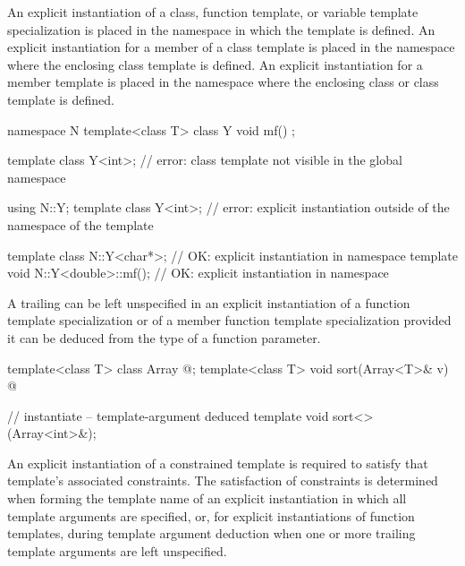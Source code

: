 \pnum
An explicit instantiation of a class, function template, or variable template
specialization is
placed in the namespace in which the template is defined.
An explicit instantiation for a member of a class template is placed in
the namespace where the enclosing class template is defined.
An explicit instantiation for a member template is placed in the namespace
where the enclosing class or class template is defined.
\begin{example}
\begin{codeblock}
namespace N {
  template<class T> class Y { void mf() { } };
}

template class Y<int>;          // error: class template  not visible in the global namespace

using N::Y;
template class Y<int>;          // error: explicit instantiation outside of the namespace of the template

template class N::Y<char*>;             // OK: explicit instantiation in namespace 
template void N::Y<double>::mf();       // OK: explicit instantiation in namespace 
\end{codeblock}
\end{example}

\pnum
A trailing
can be left unspecified in an explicit instantiation of a function template
specialization or of a member function template specialization provided
it can be deduced from the type of a function parameter.
\begin{example}
\begin{codeblock}
template<class T> class Array { @\commentellip@ };
template<class T> void sort(Array<T>& v) { @\commentellip@ }

// instantiate  -- template-argument deduced
template void sort<>(Array<int>&);
\end{codeblock}
\end{example}

\pnum
\begin{note}
An explicit instantiation of a constrained template is required
to satisfy that template's associated constraints.
The satisfaction of constraints is determined
when forming the template name of an explicit instantiation
in which all template arguments are specified,
or, for explicit instantiations of function templates,
during template argument deduction
when one or more trailing template arguments are left unspecified.
\end{note}

